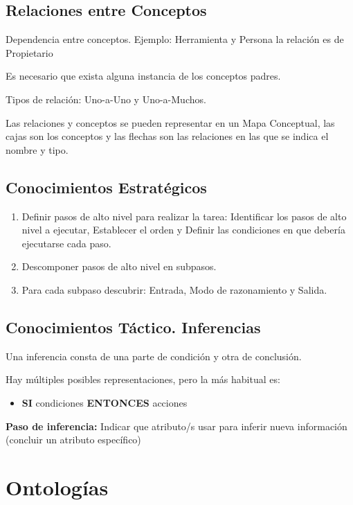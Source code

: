 \documentclass[12pt, twoside, openright]{report} %
\begin{document}
\subsection{Relaciones entre Conceptos}
Dependencia entre conceptos. Ejemplo: Herramienta y Persona la relación es de Propietario

Es necesario que exista alguna instancia de los conceptos padres.

Tipos de relación: Uno-a-Uno y Uno-a-Muchos.

Las relaciones y conceptos se pueden representar en un Mapa Conceptual, las cajas son los conceptos y las flechas son las relaciones en las que se indica el nombre y tipo.
\pagebreak

\subsection{Conocimientos Estratégicos}
\begin{enumerate}
	\item Definir pasos de alto nivel para realizar la tarea: Identificar los pasos de alto nivel a ejecutar, Establecer el orden y Definir las condiciones en que debería ejecutarse cada paso.
	\item Descomponer pasos de alto nivel en subpasos.
	\item Para cada subpaso descubrir: Entrada, Modo de razonamiento y Salida.
\end{enumerate}

\subsection{Conocimientos Táctico. Inferencias}
Una inferencia consta de una parte de condición y otra de conclusión.

Hay múltiples posibles representaciones, pero la más habitual es: 
\begin{itemize}
	\item \textbf{SI} condiciones \textbf{ENTONCES} acciones
\end{itemize}

\textbf{Paso de inferencia:} Indicar que atributo/s usar para inferir nueva información (concluir un atributo específico)

\section{Ontologías}
\end{document}
